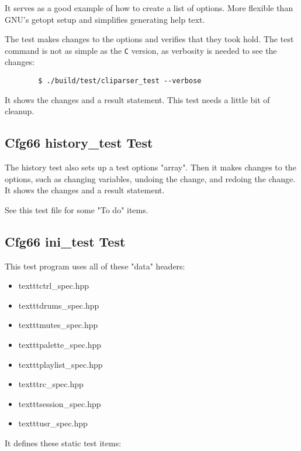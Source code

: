     It serves as a good example of how to create a list of options.
    More flexible than GNU's getopt setup and simplifies generating help
    text.

    The test makes changes to the options and verifies that they
    took hold.
    The test command is not as simple as the \texttt{C} version, as
    verbosity is needed to see the changes:

    \begin{verbatim}
        $ ./build/test/cliparser_test --verbose
    \end{verbatim}

    It shows the changes and a result statement.
    This test needs a little bit of cleanup.

\subsection{Cfg66 history\_test Test}
\label{subsec:cfg66_tests_history_test}

    The history test also sets up a test options "array".
    Then it makes changes to the options, such as changing variables,
    undoing the change, and redoing the change.
    It shows the changes and a result statement.

    See this test file for some "To do" items.

\subsection{Cfg66 ini\_test Test}
\label{subsec:cfg66_tests_ini_test}

   This test program uses all of these "data" headers:

   \begin{itemize}
      \item texttt{ctrl\_spec.hpp}
      \item texttt{drums\_spec.hpp}
      \item texttt{mutes\_spec.hpp}
      \item texttt{palette\_spec.hpp}
      \item texttt{playlist\_spec.hpp}
      \item texttt{rc\_spec.hpp}
      \item texttt{session\_spec.hpp}
      \item texttt{usr\_spec.hpp}
    \end{itemize}

    It defines these static test items:


